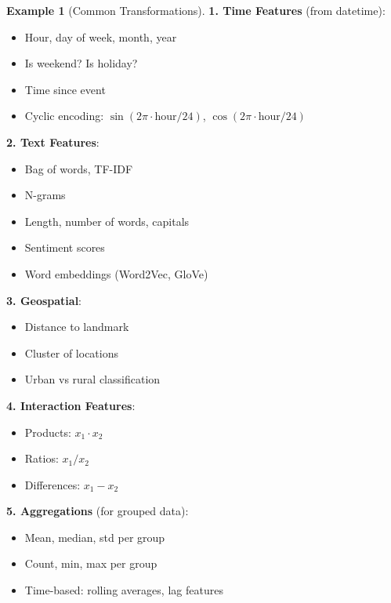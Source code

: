 \documentclass[11pt,twoside]{article}
\numberwithin{equation}{section}
\theoremstyle{plain}
\theoremstyle{definition}
\newtheorem{example}[theorem]{Example}
\theoremstyle{remark}
\begin{document}
\begin{example}[Common Transformations]

\textbf{1. Time Features} (from datetime):
\begin{itemize}
\item Hour, day of week, month, year
\item Is weekend? Is holiday?
\item Time since event
\item Cyclic encoding: $\sin(2\pi \cdot \text{hour}/24)$, $\cos(2\pi \cdot \text{hour}/24)$
\end{itemize}

\textbf{2. Text Features}:
\begin{itemize}
\item Bag of words, TF-IDF
\item N-grams
\item Length, number of words, capitals
\item Sentiment scores
\item Word embeddings (Word2Vec, GloVe)
\end{itemize}

\textbf{3. Geospatial}:
\begin{itemize}
\item Distance to landmark
\item Cluster of locations
\item Urban vs rural classification
\end{itemize}

\textbf{4. Interaction Features}:
\begin{itemize}
\item Products: $x_1 \cdot x_2$
\item Ratios: $x_1 / x_2$
\item Differences: $x_1 - x_2$
\end{itemize}

\textbf{5. Aggregations} (for grouped data):
\begin{itemize}
\item Mean, median, std per group
\item Count, min, max per group
\item Time-based: rolling averages, lag features
\end{itemize}
\end{example}
\end{document}
